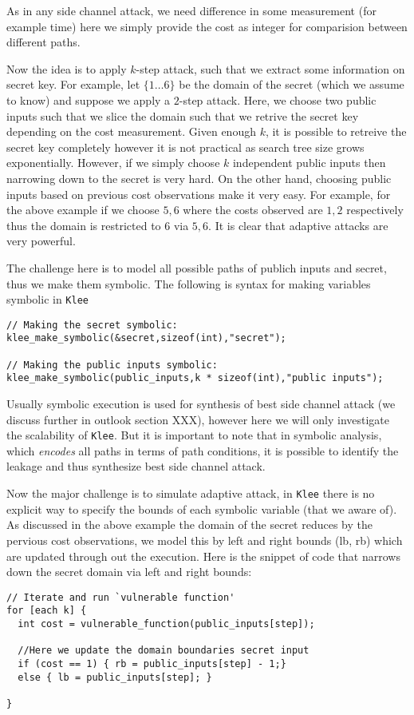 \documentclass[11pt,a4paper,notitlepage]{article}
\begin{document}
As in any side channel attack, we need difference in some measurement (for example time) here we simply provide the cost as integer
for comparision between different paths.

Now the idea is to apply $k$-step attack, such that we extract some information on secret key.
For example, let $\{1 \dots 6\}$ be the domain of the secret (which we assume to know) and suppose we apply a $2$-step attack.
Here, we choose two public inputs such that we slice the domain such that we retrive the secret key depending on the cost measurement.
Given enough $k$, it is possible to retreive the secret key completely however it is not practical as search tree size grows exponentially.
However, if we simply choose $k$ independent public inputs then narrowing down to the secret is very hard.
On the other hand, choosing public inputs based on previous cost observations make it very easy.
For example, for the above example if we choose ${5,6}$ where the costs observed are ${1,2}$ respectively thus the domain is restricted to ${6}$ via ${5,6}$. It is clear that adaptive attacks are very powerful.

The challenge here is to model all possible paths of publich inputs and secret, thus we make them symbolic.
The following is syntax for making variables symbolic in \texttt{Klee}
\begin{verbatim}
// Making the secret symbolic:
klee_make_symbolic(&secret,sizeof(int),"secret");

// Making the public inputs symbolic:
klee_make_symbolic(public_inputs,k * sizeof(int),"public inputs");
\end{verbatim}

Usually symbolic execution is used for synthesis of best side channel attack (we discuss further in outlook section XXX), however here we will only investigate the scalability of \texttt{Klee}.
But it is important to note that in symbolic analysis, which \emph{encodes} all paths in terms of path conditions, it is possible to identify the leakage and thus synthesize best side channel attack.

Now the major challenge is to simulate adaptive attack, in \texttt{Klee} there is no explicit way to specify the bounds of each symbolic variable (that we aware of).
As discussed in the above example the domain of the secret reduces by the pervious cost observations, we model this by left and right bounds (lb, rb) which are updated through out the execution.
Here is the snippet of code that narrows down the secret domain via left and right bounds:
\begin{verbatim}
// Iterate and run `vulnerable function'
for [each k] {
  int cost = vulnerable_function(public_inputs[step]);

  //Here we update the domain boundaries secret input
  if (cost == 1) { rb = public_inputs[step] - 1;}
  else { lb = public_inputs[step]; }

}
\end{verbatim}
\end{document}
